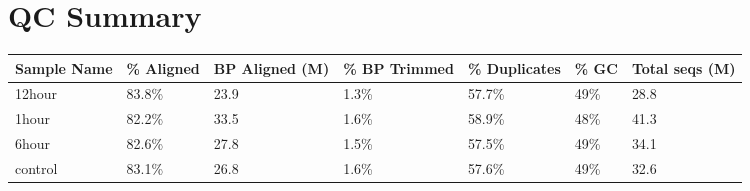 \section{QC Summary}
\begin{table}[!ht]
    \centering
    \begin{tabular}{|l|l|l|l|l|l|l|}
    \hline
        Sample Name & \% Aligned & BP Aligned (M) & \% BP Trimmed & \% Duplicates & \% GC & Total seqs (M) \\ \hline
        12hour & 83.8\% & 23.9 & 1.3\% & 57.7\% & 49\% & 28.8  \\ \hline
        1hour & 82.2\% & 33.5 & 1.6\% & 58.9\% & 48\% & 41.3  \\ \hline
        6hour & 82.6\% & 27.8 & 1.5\% & 57.5\% & 49\% & 34.1  \\ \hline
        control & 83.1\% & 26.8 & 1.6\% & 57.6\% & 49\% & 32.6  \\ \hline
     \end{tabular}
\end{table}



%

